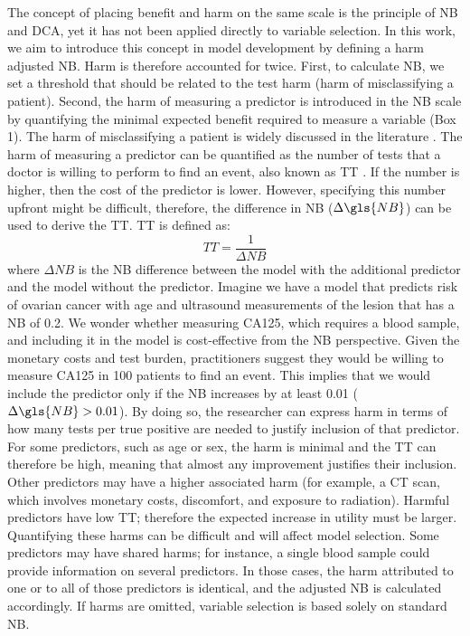 The concept of placing benefit and harm on the same scale is the principle of \gls{NB} and \gls{DCA}, yet it has not been applied directly to variable selection. In this work, we aim to introduce this concept in model development by defining a harm adjusted \gls{NB}. Harm is therefore accounted for twice. First, to calculate \gls{NB}, we set a threshold that should be related to the test harm (harm of misclassifying a patient). Second, the harm of measuring a predictor is introduced in the \gls{NB} scale by quantifying the minimal expected benefit required to measure a variable (Box 1). The harm of misclassifying a patient is widely discussed in the literature \cite{vickersSimpleStepbystepGuide2019,vickersDecisionCurveAnalysis2006}. The harm of measuring a predictor can be quantified as the number of tests that a doctor is willing to perform to find an event, also known as \gls{TT} \cite{vancalsterReportingInterpretingDecision2018}. If the number is higher, then the cost of the predictor is lower. However, specifying this number upfront might be difficult, therefore, the difference in \gls{NB} ($\Delta \gls{NB}$) can be used to derive the \gls{TT}. \gls{TT} is defined as:
\begin{equation}
TT = \frac{1}{\Delta NB}
\end{equation}
where $\Delta NB$ is the \gls{NB} difference between the model with the additional predictor and the model without the predictor. Imagine we have a model that predicts risk of ovarian cancer with age and ultrasound measurements of the lesion that has a \gls{NB} of 0.2. We wonder whether measuring CA125, which requires a blood sample, and including it in the model is cost-effective from the \gls{NB} perspective. Given the monetary costs and test burden, practitioners suggest they would be willing to measure CA125 in 100 patients to find an event. This implies that we would include the predictor only if the \gls{NB} increases by at least 0.01 ($\Delta \gls{NB} > 0.01$). By doing so, the researcher can express harm in terms of how many tests per true positive are needed to justify inclusion of that predictor. For some predictors, such as age or sex, the harm is minimal and the TT can therefore be high, meaning that almost any improvement justifies their inclusion. Other predictors may have a higher associated harm (for example, a CT scan, which involves monetary costs, discomfort, and exposure to radiation). Harmful predictors have low TT; therefore the expected increase in utility must be larger. Quantifying these harms can be difficult and will affect model selection. Some predictors may have shared harms; for instance, a single blood sample could provide information on several predictors. In those cases, the harm attributed to one or to all of those predictors is identical, and the adjusted \gls{NB} is calculated accordingly. If harms are omitted, variable selection is based solely on standard \gls{NB}.


